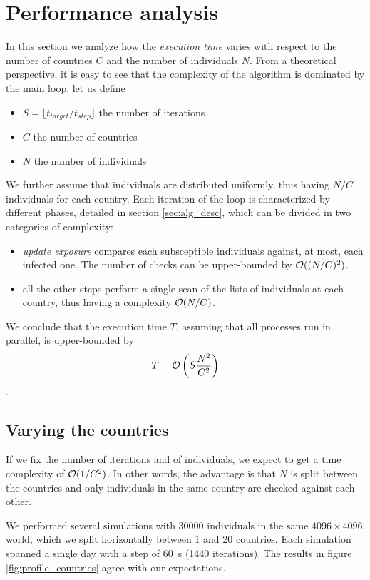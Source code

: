 \section{Performance analysis}
\label{sec:performance_analysis}

In this section we analyze how the \emph{execution time} varies with respect to the number of countries $C$ and the number of individuals $N$.
From a theoretical perspective, it is easy to see that the complexity of the algorithm is dominated by the main loop, let us define
\begin{itemize}
    \item $S = \lfloor t_{target} / t_{step} \rfloor$ the number of iterations
    \item $C$ the number of countries
    \item $N$ the number of individuals
\end{itemize}
We further assume that individuals are distributed uniformly, thus having $N/C$ individuals for each country.
Each iteration of the loop is characterized by different phases, detailed in section \ref{sec:alg_desc}, which can be divided in two categories of complexity:
\begin{itemize}
    \item \emph{update exposure} compares each subsceptible individuals against, at most, each infected one. The number of checks can be upper-bounded by $\mathcal{O}((N/C)^2)$.
    \item all the other steps perform a single scan of the lists of individuals at each country, thus having a complexity $\mathcal{O}(N/C)$.
\end{itemize}
We conclude that the execution time $T$, assuming that all processes run in parallel, is upper-bounded by \[T = \mathcal{O} \left(S \frac{N^2}{C^2} \right)\].

\subsection{Varying the countries}
If we fix the number of iterations and of individuals, we expect to get a time complexity of $\mathcal{O}(1/C^2)$. In other words, the advantage is that $N$ is split between the countries and only individuals in the same country are checked against each other.

We performed several simulations with \num{30000} individuals in the same $4096 \times 4096$ world, which we split horizontally between 1 and 20 countries. Each simulation spanned a single day with a step of \SI{60}{s} (1440 iterations). The results in figure \ref{fig:profile_countries} agree with our expectations.

